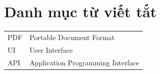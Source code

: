 \chapter*{Danh mục từ viết tắt}
\begin{tabular}{ll}
PDF & Portable Document Format \\
UI & User Interface \\
API & Application Programming Interface
\end{tabular}

